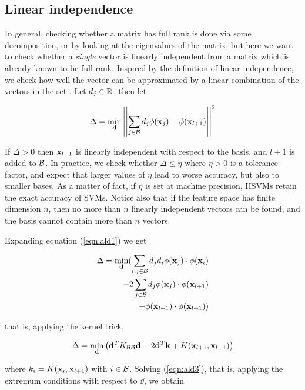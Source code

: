 \subsection*{Linear independence}

In general, checking whether a matrix has full rank is done via some
decomposition, or by looking at the eigenvalues of the matrix; but
here we want to check whether a \emph{single} vector is linearly
independent from a matrix which is already known to be
full-rank. Inspired by the definition of linear independence, we check
how well the vector can be approximated by a linear combination of the
vectors in the set \cite{EngelMM02sparse}. Let $d_j \in \mathbb{R}$; then let

\begin{equation} \label{eqn:ald1}
  \Delta = \min_{\mathbf{d}} \left|\left|\sum_{j \in \mathcal{B}} d_j \phi(\mathbf{x}_j) - \phi(\mathbf{x}_{l+1}) \right|\right|^2
\end{equation}

If $\Delta > 0$ then $\mathbf{x}_{l+1}$ is linearly independent with respect
to the basis, and $l+1$ is added to $\mathcal{B}$. In practice, we check
whether $\Delta \leq \eta$ where $\eta > 0$ is a tolerance factor, and
expect that larger values of $\eta$ lead to worse accuracy, but also
to smaller bases. As a matter of fact, if $\eta$ is set at machine
precision, IISVMs retain the exact accuracy of SVMs. Notice also that
if the feature space has finite dimension $n$, then no more than $n$
linearly independent vectors can be found, and the basis cannot
contain more than $n$ vectors.

Expanding equation (\ref{eqn:ald1}) we get

\begin{eqnarray} \label{eqn:ald2}
  \Delta = \min_{\mathbf{d}} (
      \sum_{i,j \in \mathcal{B}} d_j d_i \phi(\mathbf{x}_j) \cdot \phi(\mathbf{x}_i) \\
    - 2\sum_{j \in \mathcal{B}} d_j \phi(\mathbf{x}_j) \cdot \phi(\mathbf{x}_{l+1}) \nonumber \\
    + \phi(\mathbf{x}_{l+1}) \cdot \phi(\mathbf{x}_{l+1}) ) \nonumber
\end{eqnarray}

\noindent that is, applying the kernel trick,

\begin{equation} \label{eqn:ald3}
  \Delta = \min_{\mathbf{d}} \left(
      \mathbf{d}^T K_{\mathcal{B}\mathcal{B}}\mathbf{d}
    - 2 \mathbf{d}^T \mathbf{k}
    + K(\mathbf{x}_{l+1},\mathbf{x}_{l+1})
  \right)
\end{equation}

\noindent where $k_i = K(\mathbf{x}_i,\mathbf{x}_{l+1})$ with $i \in \mathcal{B}$. Solving
(\ref{eqn:ald3}), that is, applying the extremum conditions with
respect to $\dd$, we obtain

